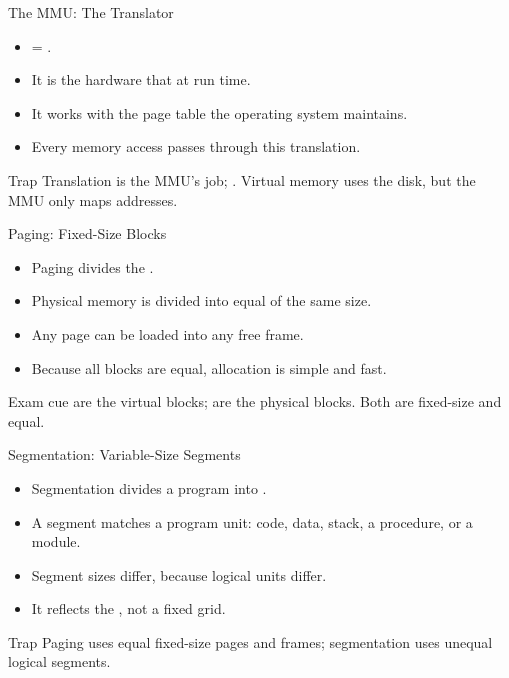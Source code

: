 \documentclass[aspectratio=169]{beamer}
\begin{document}
\begin{frame}{The MMU: The Translator}
  \begin{itemize}
    \item {} = .
    \item It is the hardware that  at run time.
    \item It works with the page table the operating system maintains.
    \item Every memory access passes through this translation.
  \end{itemize}
  \begin{alertblock}{Trap}
    Translation is the MMU's job; . Virtual memory
    uses the disk, but the MMU only maps addresses.
  \end{alertblock}
\end{frame}

\begin{frame}{Paging: Fixed-Size Blocks}
  \begin{itemize}
    \item Paging divides the .
    \item Physical memory is divided into equal  of the same size.
    \item Any page can be loaded into any free frame.
    \item Because all blocks are equal, allocation is simple and fast.
  \end{itemize}
  \begin{block}{Exam cue}
     are the virtual blocks;  are the physical blocks.
    Both are fixed-size and equal.
  \end{block}
\end{frame}

\begin{frame}{Segmentation: Variable-Size Segments}
  \begin{itemize}
    \item Segmentation divides a program into .
    \item A segment matches a program unit: code, data, stack, a procedure,
      or a module.
    \item Segment sizes differ, because logical units differ.
    \item It reflects the , not a fixed grid.
  \end{itemize}
  \begin{alertblock}{Trap}
     Paging uses equal fixed-size pages and
    frames; segmentation uses unequal logical segments.
  \end{alertblock}
\end{frame}
\end{document}
